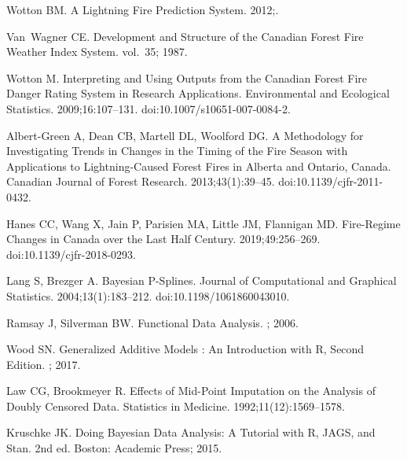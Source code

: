 \documentclass[10pt,letterpaper]{article}
\begin{document}
\begin{thebibliography}{10}
Wotton BM.
\newblock A Lightning Fire Prediction System. 2012;.

Van~Wagner CE.
\newblock Development and Structure of the {{Canadian Forest Fire Weather Index
  System}}. vol.~35; 1987.

Wotton M.
\newblock Interpreting and Using Outputs from the {{Canadian Forest Fire Danger
  Rating System}} in Research Applications.
\newblock Environmental and Ecological Statistics. 2009;16:107--131.
\newblock doi:{10.1007/s10651-007-0084-2}.

{Albert-Green} A, Dean CB, Martell DL, Woolford DG.
\newblock A Methodology for Investigating Trends in Changes in the Timing of
  the Fire Season with Applications to Lightning-Caused Forest Fires in
  {{Alberta}} and {{Ontario}}, {{Canada}}.
\newblock Canadian Journal of Forest Research. 2013;43(1):39--45.
\newblock doi:{10.1139/cjfr-2011-0432}.

Hanes CC, Wang X, Jain P, Parisien MA, Little JM, Flannigan MD.
\newblock Fire-Regime Changes in {{Canada}} over the Last Half Century.
  2019;49:256--269.
\newblock doi:{10.1139/cjfr-2018-0293}.

Lang S, Brezger A.
\newblock Bayesian {{P}}-{{Splines}}.
\newblock Journal of Computational and Graphical Statistics.
  2004;13(1):183--212.
\newblock doi:{10.1198/1061860043010}.

Ramsay J, Silverman BW.
\newblock Functional {{Data Analysis}}.
; 2006.

Wood SN.
\newblock Generalized {{Additive Models}} : {{An Introduction}} with {{R}},
  {{Second Edition}}.
; 2017.

Law CG, Brookmeyer R.
\newblock Effects of Mid-Point Imputation on the Analysis of Doubly Censored
  Data.
\newblock Statistics in Medicine. 1992;11(12):1569--1578.

Kruschke JK.
\newblock Doing {{Bayesian Data Analysis}}: {{A Tutorial}} with {{R}},
  {{JAGS}}, and {{Stan}}.
\newblock 2nd ed. {Boston}: {Academic Press}; 2015.


\end{thebibliography}
\end{document}
